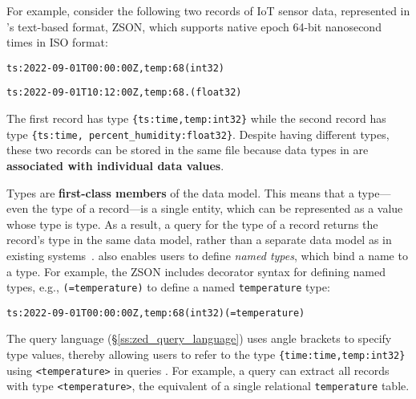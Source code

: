 For example, consider the following two records of IoT sensor data, represented in \sys{}'s text-based format, ZSON, which supports native epoch 64-bit nanosecond times in ISO format:

\noindent{}\texttt{{ts:2022-09-01T00:00:00Z,temp:68(int32)}}

\noindent{}\texttt{{ts:2022-09-01T10:12:00Z,temp:68.(float32)}}

\noindent{}The first record has type \texttt{\{ts:time,temp:int32\}} while the second record has type \texttt{\{ts:time, percent\_humidity:float32\}}.
Despite having different types, these two records can be stored in the same file because data types in \sys{} are {\bf associated with individual data values}.


Types are {\bf first-class members} of the \sys{} data model. This means that a type---even the type of a record---is a single entity, which can be represented as a \sys{} value whose type is type. As a result, a query for the type of a record returns the record's type in the same \sys{} data model, rather than a separate data model as in existing systems~\cite{aurum}. \sys{} also enables users to define {\em named types}, which bind a name to a type. For example, the ZSON includes decorator syntax for defining named types, e.g., \texttt{(=temperature)} to define a named \texttt{temperature} type:

\noindent{}\texttt{{ts:2022-09-01T00:00:00Z,temp:68(int32)}(=temperature)}

\noindent{}The \sys{} query language (\S\ref{ss:zed_query_language}) uses angle brackets to specify type values, thereby allowing users to refer to the type \texttt{\{time:time,temp:int32\}} using \texttt{<temperature>} in queries . For example, a query can extract all records with type \texttt{<temperature>}, the equivalent of a single relational \texttt{temperature} table.


